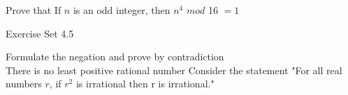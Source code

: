 \documentclass[12pt,letterpaper, onecolumn]{exam}
\begin{document}
\begin{questions}
\begin{questions}
			\setcounter{question}{42} \question Prove that If $n$ is an odd integer, then $n^4$ $mod$ 16 $=1$
		\end{questions}
		
		\centering\large Exercise Set 4.5
		\begin{questions}
			\setcounter{question}{6}\question Formulate the negation and prove by contradiction\\
			There is no least positive rational number 
			\setcounter{question}{21}\question Consider the statement "For all real numbers $r$, if $r^2$ is irrational then r is irrational."
\end{questions}
\end{questions}
\end{document}
